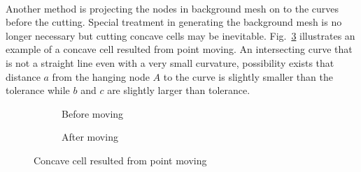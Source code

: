 \paragraph{}
Another method is projecting the nodes in background mesh on to the curves before the cutting.
Special treatment in generating the background mesh is no longer necessary but cutting concave cells may be inevitable.
Fig.~\ref{qdt_fig:qdt_cutting_point_moving_2_concave} illustrates an example of a concave cell resulted from point moving.
An intersecting curve that is not a straight line even with a very small curvature, possibility exists that distance $a$ from the hanging node $A$ to the curve is slightly smaller than the tolerance while $b$ and $c$ are slightly larger than tolerance.
    \begin{figure}[!ht]
        \begin{subfigure}[b]{0.5\linewidth}
            \centering
            \caption{Before moving}
            \label{qdt_fig:qdt_cutting_point_moving_2_concave_before}
        \end{subfigure}
        \begin{subfigure}[b]{0.5\linewidth}
            \centering
            \caption{After moving}
            \label{qdt_fig:qdt_cutting_point_moving_2_concave_after}
        \end{subfigure}
        \caption[Concave cell resulted from points moving]{Concave cell resulted from point moving}
        \label{qdt_fig:qdt_cutting_point_moving_2_concave}
    \end{figure}

